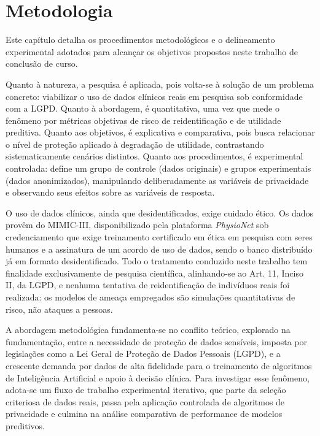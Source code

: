 \chapter{Metodologia}
\label{ch:metodologia}

Este capítulo detalha os procedimentos metodológicos e o delineamento experimental adotados para alcançar os objetivos propostos neste trabalho de conclusão de curso.

Quanto à natureza, a pesquisa é aplicada, pois volta-se à solução de um problema concreto: viabilizar o uso de dados clínicos reais em pesquisa sob conformidade com a LGPD. Quanto à abordagem, é quantitativa, uma vez que mede o fenômeno por métricas objetivas de risco de reidentificação e de utilidade preditiva. Quanto aos objetivos, é explicativa e comparativa, pois busca relacionar o nível de proteção aplicado à degradação de utilidade, contrastando sistematicamente cenários distintos. Quanto aos procedimentos, é experimental controlada: define um grupo de controle (dados originais) e grupos experimentais (dados anonimizados), manipulando deliberadamente as variáveis de privacidade e observando seus efeitos sobre as variáveis de resposta.

O uso de dados clínicos, ainda que desidentificados, exige cuidado ético. Os dados provêm do MIMIC-III, disponibilizado pela plataforma \textit{PhysioNet} sob credenciamento que exige treinamento certificado em ética em pesquisa com seres humanos e a assinatura de um acordo de uso de dados, sendo o banco distribuído já em formato desidentificado. Todo o tratamento conduzido neste trabalho tem finalidade exclusivamente de pesquisa científica, alinhando-se ao Art. 11, Inciso II, da LGPD, e nenhuma tentativa de reidentificação de indivíduos reais foi realizada: os modelos de ameaça empregados são simulações quantitativas de risco, não ataques a pessoas.

A abordagem metodológica fundamenta-se no conflito teórico, explorado na fundamentação, entre a necessidade de proteção de dados sensíveis, imposta por legislações como a Lei Geral de Proteção de Dados Pessoais (LGPD), e a crescente demanda por dados de alta fidelidade para o treinamento de algoritmos de Inteligência Artificial e apoio à decisão clínica. Para investigar esse fenômeno, adota-se um fluxo de trabalho experimental iterativo, que parte da seleção criteriosa de dados reais, passa pela aplicação controlada de algoritmos de privacidade e culmina na análise comparativa de performance de modelos preditivos.

